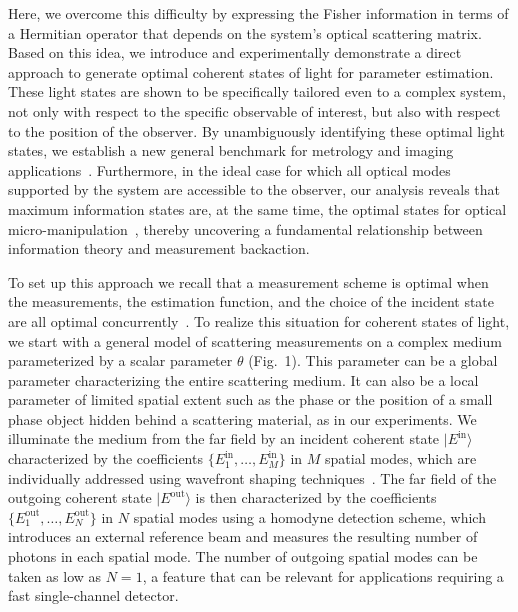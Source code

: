 \documentclass[aps,pra,twocolumn,amsmath,amssymb,superscriptaddress,10pt,nobibnotes]{revtex4-2}
\begin{document}
Here, we overcome this difficulty by expressing the Fisher information in terms of a Hermitian operator that depends on the system's optical scattering matrix.
Based on this idea, we introduce and experimentally demonstrate a direct approach to generate optimal coherent states of light for parameter estimation. These light states are shown to be specifically tailored even to a complex system, not only with respect to the specific observable of interest, but also with respect to the position of the observer. By unambiguously identifying these optimal light states, we establish a new general benchmark for metrology and imaging applications~\cite{osten_optical_2012,barrett_foundations_2013}. 
Furthermore, in the ideal case for which all optical modes supported by the system are accessible to the observer, our analysis reveals that maximum information states are, at the same time, the optimal states for optical micro-manipulation~\cite{ambichl_focusing_2017,horodynski_optimal_2020}, thereby uncovering a fundamental relationship between information theory and measurement backaction.

To set up this approach we recall that a measurement scheme is optimal when the measurements, the estimation function, and the choice of the incident state are all optimal concurrently~\cite{giovannetti_advances_2011}. To realize this situation for coherent states of light, we start with a general model of scattering measurements on a complex medium parameterized by a scalar parameter $\theta$ (Fig.~1). This parameter can be a global parameter characterizing the entire scattering medium. It can also be a local parameter of limited spatial extent such as the phase or the position of a small phase object hidden behind a scattering material, as in our experiments. We illuminate the medium from the far field by an incident coherent state $|E^\mathrm{in}\rangle$ characterized by the coefficients $\{E_1^\mathrm{in},\dots,E_M^\mathrm{in}\}$ in $M$ spatial modes, which are individually addressed using wavefront shaping techniques~\cite{mosk_controlling_2012}. The far field of the outgoing coherent state $|E^\mathrm{out}\rangle$  is then characterized by the coefficients $\{E_1^\mathrm{out},\dots,E_N^\mathrm{out}\}$ in $N$ spatial modes using a homodyne detection scheme, which introduces an external reference beam and measures the resulting number of photons in each spatial mode. The number of outgoing spatial modes can be taken as low as $N=1$, a feature that can be relevant for applications requiring a fast single-channel detector.
\end{document}
